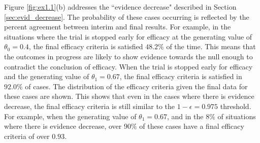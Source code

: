 \documentclass[useAMS,usenatbib,referee]{biom}
\begin{document}
Figure \ref{fig:ex1.1}(b) addresses the ``evidence decrease" described in Section \ref{sec:evid_decrease}. The probability of these cases occurring is reflected by the percent agreement between interim and final results. For example, in the situations where the trial is stopped early for efficacy at the generating value of $\theta_0=0.4$, the final efficacy criteria is satisfied $48.2\%$ of the time. This means that the outcomes in progress are likely to show evidence towards the null enough to contradict the conclusion of efficacy. When the trial is stopped early for efficacy and the generating value of $\theta_1=0.67$, the final efficacy criteria is satisfied in $92.0\%$ of cases. The distribution of the efficacy criteria given the final data for these cases are shown. This shows that even in the cases where there is evidence decrease, the final efficacy criteria is still similar to the $1-\epsilon=0.975$ threshold. For example, when the generating value of $\theta_1=0.67$, and in the $8\%$ of situations where there is evidence decrease, over $90\%$ of these cases have a final efficacy criteria of over $0.93$.
%
\end{document}

